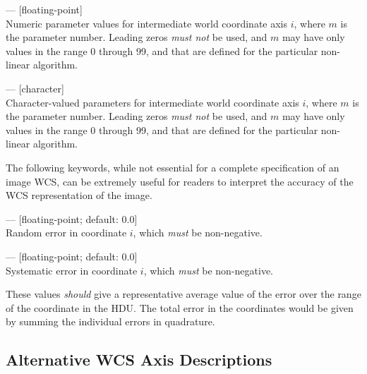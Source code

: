 \documentclass[11pt,makeidx]{book}     %
\begin{document}
\begin{description}

\item {}  --- [floating-point]\\ 
Numeric parameter values for
intermediate world coordinate axis $i$, where $m$ is the parameter number. Leading
zeros {\em must not} be used, and $m$ may have only values in the range 0 through 99,
and that are defined for the particular non-linear algorithm. 

\item {}  --- [character]\\ 
Character-valued parameters for
intermediate world coordinate axis $i$, where $m$ is the parameter number. Leading
zeros {\em must not} be used, and $m$ may have only values in the range 0 through 99,
and that are defined for the particular non-linear algorithm. 

\end{description}

The following keywords, while not essential for a complete specification of an
image WCS, can be extremely useful for readers to interpret the accuracy of the
WCS representation of the image. 

\begin{description}

\item {}  --- [floating-point; default: 0.0]\\ 
Random error in coordinate $i$, which {\em must} be non-negative. 

\item {}  --- [floating-point; default: 0.0]\\ 
Systematic error in coordinate $i$, which {\em must} be non-negative. 

\end{description}

\noindent These values {\em should} give a representative average value of the
error over the range of the coordinate in the HDU. The total error in the
coordinates would be given by summing the individual errors in quadrature. 

\subsection{Alternative WCS Axis Descriptions}
\end{document}
